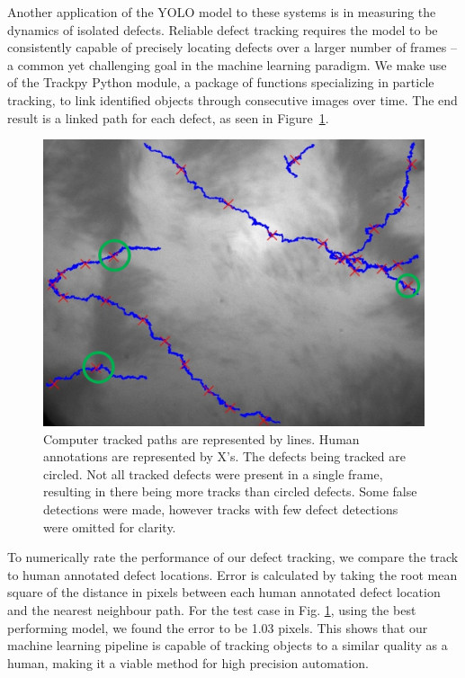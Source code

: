 \documentclass[twoside,twocolumn,9pt]{article}
\begin{document}
Another application of the YOLO model to these systems is in measuring the dynamics of isolated defects.
Reliable defect tracking requires the model to be consistently capable of precisely locating defects over a larger number of frames -- a common yet challenging goal in the machine learning paradigm. We make use of the Trackpy Python module, a package of functions specializing in particle tracking, to link identified objects through consecutive images over time. The end result is a linked path for each defect, as seen in Figure~\ref{fig:tracks}.

\begin{figure}
  \includegraphics[width=\linewidth]{circleTrack.jpg}
  \caption{Computer tracked paths are represented by lines. Human annotations are represented by X's. The defects being tracked are circled. Not all tracked defects were present in a single frame, resulting in there being more tracks than circled defects. Some false detections were made, however tracks with few defect detections were omitted for clarity. }
  \label{fig:tracks} 
\end{figure}

To numerically rate the performance of our defect tracking, we compare the track to human annotated defect locations. Error is calculated by taking the root mean square of the distance in pixels between each human annotated defect location and the nearest neighbour path. For the test case in Fig. \ref{fig:tracks}, using the best performing model, we found the error to be 1.03 pixels. This shows that our machine learning pipeline is capable of tracking objects to a similar quality as a human, making it a viable method for high precision automation.
\end{document}
